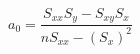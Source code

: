 \documentclass[12pt]{article}
\begin{document}
$ \begin{equation*}a_0=\dfrac{S_{xx}S_y-S_{xy}S_x}{nS_{xx}-(S_x)^2}\end{equation*} $
\end{document}
